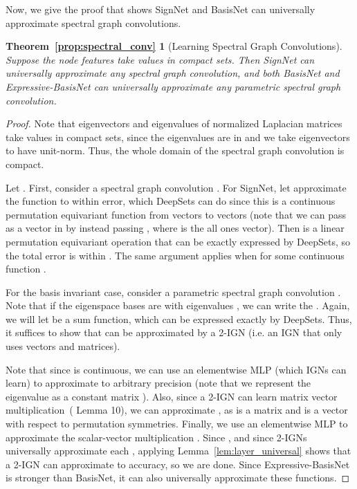 \documentclass{article} \usepackage{iclr2023_conference,times}
\begin{document}
Now, we give the proof that shows SignNet and BasisNet can universally approximate spectral graph convolutions.
\newtheorem*{prop:spectral_conv}{Theorem~\ref{prop:spectral_conv}}
\begin{prop:spectral_conv}[Learning Spectral Graph Convolutions]
    Suppose the node features  take values in compact sets. Then SignNet can universally approximate any spectral graph convolution, and both BasisNet and Expressive-BasisNet can universally approximate any parametric spectral graph convolution.
\end{prop:spectral_conv}
\begin{proof}
    Note that eigenvectors and eigenvalues of normalized Laplacian matrices take values in compact sets, since the eigenvalues are in  and we take eigenvectors to have unit-norm. Thus, the whole domain of the spectral graph convolution is compact.

    Let . First, consider a spectral graph convolution . For SignNet, let  approximate the function  to within  error, which DeepSets can do since this is a continuous permutation equivariant function from vectors to vectors \citep{segol2019universal} (note that we can pass  as a vector in  by instead passing , where  is the all ones vector). Then  is a linear permutation equivariant operation that can be exactly expressed by DeepSets, so the total error is within . The same argument applies when  for some continuous function .
  
    For the basis invariant case, consider a parametric spectral graph convolution . Note that if the eigenspace bases are  with eigenvalues , we can write the . Again, we will let  be a sum function, which can be expressed exactly by DeepSets. Thus, it suffices to show that  can be  approximated by a 2-IGN (i.e. an IGN that only uses vectors and matrices).

    Note that since  is continuous, we can use an elementwise MLP (which IGNs can learn) to approximate  to arbitrary precision (note that we represent the eigenvalue  as a constant matrix ). Also, since a 2-IGN can learn matrix vector multiplication~(\cite{cai2022convergence} Lemma 10), we can approximate , as  is a matrix and  is a vector with respect to permutation symmetries. Finally, we use an elementwise MLP to approximate the scalar-vector multiplication . Since , and since 2-IGNs universally approximate each , applying Lemma~\ref{lem:layer_universal} shows that a 2-IGN can approximate  to  accuracy, so we are done. Since Expressive-BasisNet is stronger than BasisNet, it can also universally approximate these functions.
\end{proof}
\end{document}

